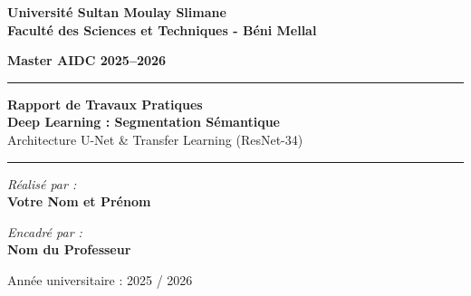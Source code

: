 \documentclass[12pt, a4paper]{article}
\begin{document}
\begin{titlepage}
    \centering
    \vspace*{0.5cm}
    
    {\Large \textbf{Université Sultan Moulay Slimane}}\\
    \vspace{0.2cm}
    {\large \textbf{Faculté des Sciences et Techniques - Béni Mellal}}\\
    \vspace{2cm}
    
    {\Large \textbf{Master AIDC 2025–2026}}\\
    \vspace{2cm}
    
    \rule{\textwidth}{1pt}
    \vspace{0.6cm}
    {\huge \textbf{Rapport de Travaux Pratiques}}\\
    \vspace{0.4cm}
    {\Large \textbf{Deep Learning : Segmentation Sémantique}}\\
    \vspace{0.3cm}
    {\large Architecture U-Net \& Transfer Learning (ResNet-34)}\\
    \vspace{0.4cm}
    \rule{\textwidth}{1pt}
    
    \vspace{3cm}
    
    \begin{minipage}{0.4\textwidth}
        \begin{flushleft} \large
            \emph{Réalisé par :}\\
            \textbf{Votre Nom et Prénom} %
        \end{flushleft}
    \end{minipage}
    \hfill
    \begin{minipage}{0.4\textwidth}
        \begin{flushright} \large
            \emph{Encadré par :} \\
            \textbf{Nom du Professeur} %
        \end{flushright}
    \end{minipage}
    
    \vfill
    
    {\normalsize Année universitaire : 2025 / 2026}
\end{titlepage}
\end{document}
